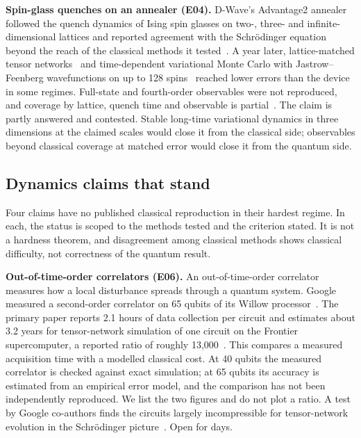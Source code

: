 \documentclass[10pt,a4paper]{article}
\begin{document}
\textbf{Spin-glass quenches on an annealer (E04).} D-Wave's Advantage2 annealer followed the quench dynamics of Ising spin glasses on two-, three- and infinite-dimensional lattices and reported agreement with the Schr\"odinger equation beyond the reach of the classical methods it tested~\cite{king2025}. A year later, lattice-matched tensor networks~\cite{tindall2025} and time-dependent variational Monte Carlo with Jastrow--Feenberg wavefunctions on up to 128 spins~\cite{mauron2025} reached lower errors than the device in some regimes. Full-state and fourth-order observables were not reproduced, and coverage by lattice, quench time and observable is partial~\cite{kingreply}. The claim is partly answered and contested. Stable long-time variational dynamics in three dimensions at the claimed scales would close it from the classical side; observables beyond classical coverage at matched error would close it from the quantum side.

\subsection{Dynamics claims that stand}
Four claims have no published classical reproduction in their hardest regime. In each, the status is scoped to the methods tested and the criterion stated. It is not a hardness theorem, and disagreement among classical methods shows classical difficulty, not correctness of the quantum result.

\textbf{Out-of-time-order correlators (E06).} An out-of-time-order correlator measures how a local disturbance spreads through a quantum system. Google measured a second-order correlator on 65 qubits of its Willow processor~\cite{google2025otoc}. The primary paper reports 2.1 hours of data collection per circuit and estimates about 3.2 years for tensor-network simulation of one circuit on the Frontier supercomputer, a reported ratio of roughly 13{,}000~\cite{google2025otoc,googleblog2025}. This compares a measured acquisition time with a modelled classical cost. At 40 qubits the measured correlator is checked against exact simulation; at 65 qubits its accuracy is estimated from an empirical error model, and the comparison has not been independently reproduced. We list the two figures and do not plot a ratio. A test by Google co-authors finds the circuits largely incompressible for tensor-network evolution in the Schr\"odinger picture~\cite{bermejo2026}. Open for  days.
\end{document}
